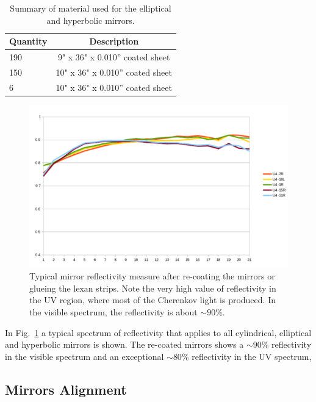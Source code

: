 \begin{table}[h]
	\begin{center}
		\begin{tabular}{| l | c |}
			\hline \hline
			Quantity  & Description \\
			\hline
			190       & 9" x 36" x 0.010” coated sheet    \\
			150       & 10" x 36" x 0.010” coated sheet   \\
			6         & 10" x 36" x 0.010” coated sheet   \\
			\hline \hline
		\end{tabular}
	\end{center}
	\caption{Summary of material used for the elliptical and hyperbolic mirrors.}\label{tab:strips}
\end{table}

\begin{figure}[h]
\centering
\includegraphics[width=0.95\columnwidth,keepaspectratio]{img/mirrorsReflectivityAfter.png}
\caption{Typical mirror reflectivity measure after re-coating the mirrors or glueing the lexan strips. Note the very high value of reflectivity
in the UV region, where most of the Cherenkov light is produced. In the visible spectrum, the reflectivity is about $\sim 90\%$.}
\label{fig:reflectivityAfter}
\end{figure}



In Fig.~\ref{fig:reflectivityAfter} a typical spectrum of reflectivity that applies to all cylindrical, elliptical and hyperbolic mirrors is shown.
The re-coated mirrors shows a $\sim 90\%$ reflectivity in the visible spectrum and an exceptional $\sim 80\%$
reflectivity in the UV spectrum,


\subsection{Mirrors Alignment}


